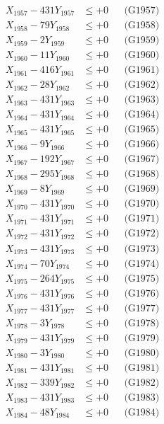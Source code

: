 \documentclass[a4paper,10pt]{article}
\begin{document}
{\begin{align}
X_{1957} - 431Y_{1957} &\leq +0 && \text{(G1957)} \\
X_{1958} - 79Y_{1958} &\leq +0 && \text{(G1958)} \\
X_{1959} - 2Y_{1959} &\leq +0 && \text{(G1959)} \\
X_{1960} - 11Y_{1960} &\leq +0 && \text{(G1960)} \\
\allowbreak
X_{1961} - 416Y_{1961} &\leq +0 && \text{(G1961)} \\
X_{1962} - 28Y_{1962} &\leq +0 && \text{(G1962)} \\
X_{1963} - 431Y_{1963} &\leq +0 && \text{(G1963)} \\
X_{1964} - 431Y_{1964} &\leq +0 && \text{(G1964)} \\
X_{1965} - 431Y_{1965} &\leq +0 && \text{(G1965)} \\
X_{1966} - 9Y_{1966} &\leq +0 && \text{(G1966)} \\
X_{1967} - 192Y_{1967} &\leq +0 && \text{(G1967)} \\
X_{1968} - 295Y_{1968} &\leq +0 && \text{(G1968)} \\
X_{1969} - 8Y_{1969} &\leq +0 && \text{(G1969)} \\
X_{1970} - 431Y_{1970} &\leq +0 && \text{(G1970)} \\
\allowbreak
X_{1971} - 431Y_{1971} &\leq +0 && \text{(G1971)} \\
X_{1972} - 431Y_{1972} &\leq +0 && \text{(G1972)} \\
X_{1973} - 431Y_{1973} &\leq +0 && \text{(G1973)} \\
X_{1974} - 70Y_{1974} &\leq +0 && \text{(G1974)} \\
X_{1975} - 264Y_{1975} &\leq +0 && \text{(G1975)} \\
X_{1976} - 431Y_{1976} &\leq +0 && \text{(G1976)} \\
X_{1977} - 431Y_{1977} &\leq +0 && \text{(G1977)} \\
X_{1978} - 3Y_{1978} &\leq +0 && \text{(G1978)} \\
X_{1979} - 431Y_{1979} &\leq +0 && \text{(G1979)} \\
X_{1980} - 3Y_{1980} &\leq +0 && \text{(G1980)} \\
\allowbreak
X_{1981} - 431Y_{1981} &\leq +0 && \text{(G1981)} \\
X_{1982} - 339Y_{1982} &\leq +0 && \text{(G1982)} \\
X_{1983} - 431Y_{1983} &\leq +0 && \text{(G1983)} \\
X_{1984} - 48Y_{1984} &\leq +0 && \text{(G1984)} \\

\end{align}}
\end{document}
